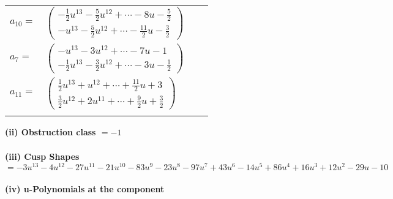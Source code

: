 \documentclass[1p]{elsarticle_modified}
\theoremstyle{definition}
\begin{document}
\begin{tabular}{m{7pt} m{180pt} m{7pt} m{180pt} }
\flushright $a_{10}=$&$\begin{pmatrix}-\frac{1}{2} u^{13}-\frac{5}{2} u^{12}+\cdots-8 u-\frac{5}{2}\\- u^{13}-\frac{5}{2} u^{12}+\cdots-\frac{11}{2} u-\frac{3}{2}\end{pmatrix}$ \\
\flushright $a_{7}=$&$\begin{pmatrix}- u^{13}-3 u^{12}+\cdots-7 u-1\\-\frac{1}{2} u^{13}-\frac{3}{2} u^{12}+\cdots-3 u-\frac{1}{2}\end{pmatrix}$ \\
\flushright $a_{11}=$&$\begin{pmatrix}\frac{1}{2} u^{13}+u^{12}+\cdots+\frac{11}{2} u+3\\\frac{3}{2} u^{12}+2 u^{11}+\cdots+\frac{9}{2} u+\frac{3}{2}\end{pmatrix}$\\&\end{tabular}
\flushleft \textbf{(ii) Obstruction class $= -1$}\\~\\
\flushleft \textbf{(iii) Cusp Shapes $= -3 u^{13}-4 u^{12}-27 u^{11}-21 u^{10}-83 u^9-23 u^8-97 u^7+43 u^6-14 u^5+86 u^4+16 u^3+12 u^2-29 u-10$}\\~\\
\newpage\renewcommand{\arraystretch}{1}
\flushleft \textbf{(iv) u-Polynomials at the component}\newline \\
\end{document}
